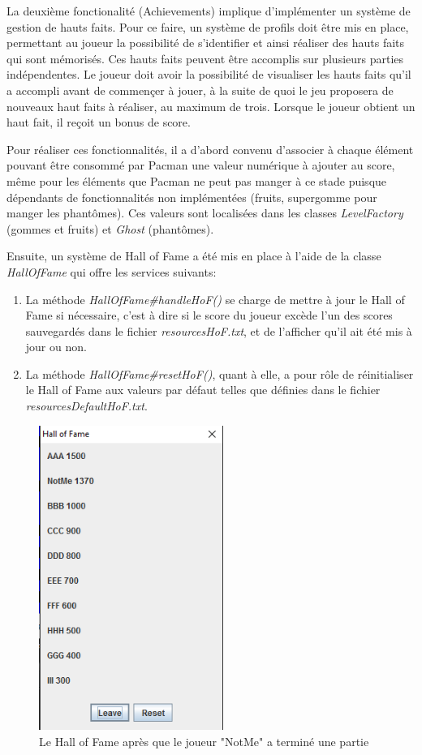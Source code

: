 \documentclass[12pt, openany]{report}
\begin{document}
La deuxième fonctionalité (Achievements) implique d'implémenter un système de gestion de hauts faits. 
Pour ce faire, un système de profils doit être mis en place, permettant au joueur la possibilité de s'identifier et ainsi réaliser des hauts faits qui sont mémorisés.
Ces hauts faits peuvent être accomplis sur plusieurs parties indépendentes.
Le joueur doit avoir la possibilité de visualiser les hauts faits qu'il a accompli avant de commençer à jouer, à la suite de quoi le jeu proposera de nouveaux haut faits à réaliser, au maximum de trois.
Lorsque le joueur obtient un haut fait, il reçoit un bonus de score.

Pour réaliser ces fonctionnalités, il a d'abord convenu d'associer à chaque élément pouvant être consommé par Pacman une valeur numérique à ajouter au score, même pour les éléments que Pacman ne peut pas manger à ce stade puisque dépendants de fonctionnalités non implémentées (fruits, supergomme pour manger les phantômes).
Ces valeurs sont localisées dans les classes \mbox{\textit{LevelFactory}} (gommes et fruits) et \mbox{\textit{Ghost}} (phantômes).

Ensuite, un système de Hall of Fame a été mis en place à l'aide de la classe \mbox{\textit{HallOfFame}} qui offre les services suivants:

\begin{enumerate}
\item La méthode \mbox{\textit{HallOfFame\#handleHoF()}} se charge de mettre à jour le Hall of Fame si nécessaire, c'est à dire si le score du joueur excède l'un des scores sauvegardés dans le fichier \mbox{\textit{resources\\HoF.txt}}, et de l'afficher qu'il ait été mis à jour ou non.
\item La méthode \mbox{\textit{HallOfFame\#resetHoF()}}, quant à elle, a pour rôle de réinitialiser le Hall of Fame aux valeurs par défaut telles que définies dans le fichier \mbox{\textit{resources\\DefaultHoF.txt}}.
\end{enumerate}

\begin{figure}[h]
	\centering
	\includegraphics[width=6cm]{Images/HoF.png}
	\caption{\label{hof} Le Hall of Fame après que le joueur "NotMe" a terminé une partie}
\end{figure}
\end{document}
